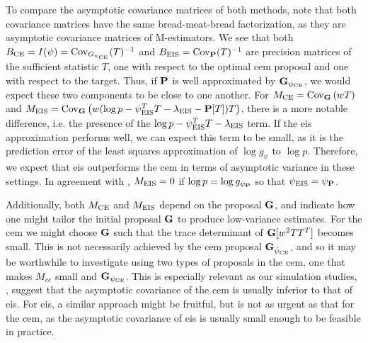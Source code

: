 To compare the asymptotic covariance matrices of both methods, note that both covariance matrices have the same \glqq{}bread-meat-bread\grqq{} factorization, as they are asymptotic covariance matrices of M-estimators. We see that both $B_{\ce} = I(\psi) = \cov_{G_{\pce}}(T)^{-1}$ and $B_{\eis} = \cov_{\P}(T)^{-1}$ are precision matrices of the sufficient statistic $T$, one with respect to the optimal \acrshort{cem} proposal and one with respect to the target. Thus, if $\P$ is well approximated by $\G_{\pce}$, we would expect these two components to be close to one another. 
For $M_{\ce} = \cov_{\G} \left( w T \right)$ and $M_{\eis} = \cov_{\G}\left( w (\log p - \psi_{\eis}^{T}T - \lambda_{\eis} - \P [T])T \right)$, there is a more notable difference, i.e. the presence of the $\log p - \psi_{\eis}^TT-\lambda_{\eis}$ term. If the \acrshort{eis} approximation performs well, we can expect this term to be small, as it is the prediction error of the least squares approximation of $\log g_{\psi}$ to $\log p$. Therefore, we expect that \acrshort{eis} outperforms the \acrshort{cem} in terms of asymptotic variance in these settings. In agreement with , $M_{\eis} = 0$ if $\log p = \log g_{\psi_{\P}}$ so that $\peis = \psi_{\P}$.

Additionally, both $M_{\ce}$ and $M_{\eis}$ depend on the proposal $\G$, and indicate how one might tailor the initial proposal $\G$ to produce low-variance estimates. For the \acrshort{cem} we might choose $\G$ such that the trace determinant of $\G [w^{2} TT^{T}]$ becomes small. This is not necessarily achieved by the \acrshort{cem} proposal $\G_{\hpce}$, and so it may be worthwhile to investigate using two types of proposals in the \acrshort{cem}, one that makes $M_{ce}$ small and $\G_{\pce}$. This is especially relevant as our simulation studies, , suggest that the asymptotic covariance of the \acrshort{cem} is usually inferior to that of \acrshort{eis}. For \acrshort{eis}, a similar approach might be fruitful, but is not as urgent as that for the \acrshort{cem}, as the asymptotic covariance of \acrshort{eis} is usually small enough to be feasible in practice.

